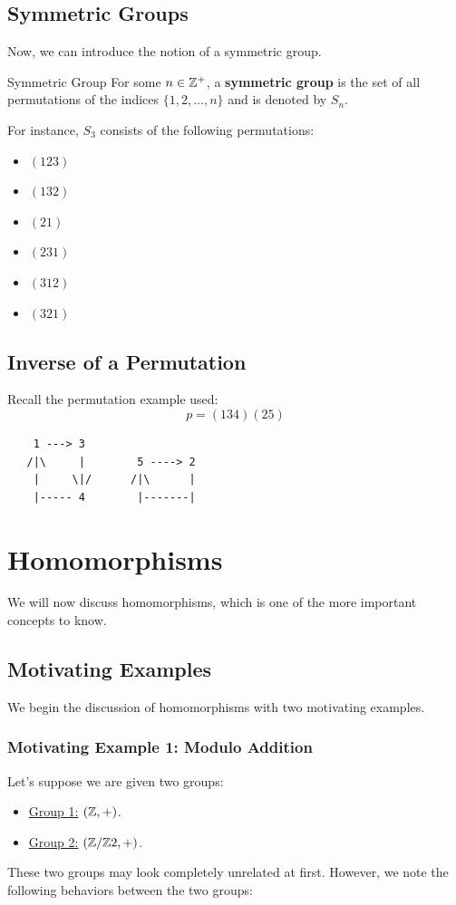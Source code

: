 \documentclass[letterpaper]{article}
\begin{document}
\subsection{Symmetric Groups}
Now, we can introduce the notion of a symmetric group. 
\begin{definition}{Symmetric Group}{}
    For some $n \in \mathbb{Z}^+$, a \textbf{symmetric group} is the set of all permutations of the indices $\{1, 2, \dots, n\}$ and is denoted by $S_n$. 
\end{definition}
For instance, $S_3$ consists of the following permutations: 
\begin{itemize}
    \item $(123)$
    \item $(132)$
    \item $(21)$
    \item $(231)$
    \item $(312)$
    \item $(321)$
\end{itemize}

\subsection{Inverse of a Permutation}
Recall the permutation example used: 
\[p = (1 3 4)(2 5)\]
\begin{verbatim}
    1 ---> 3
   /|\     |        5 ----> 2
    |     \|/      /|\      |
    |----- 4        |-------|
\end{verbatim}








\newpage 
\section{Homomorphisms}
We will now discuss homomorphisms, which is one of the more important concepts to know.  

\subsection{Motivating Examples}
We begin the discussion of homomorphisms with two motivating examples.

\subsubsection{Motivating Example 1: Modulo Addition}
Let's suppose we are given two groups: 
\begin{itemize}
    \item \underline{Group 1:} $(\mathbb{Z}, +)$. 
    \item \underline{Group 2:} $(\mathbb{Z} / \mathbb{Z} 2, +)$.
\end{itemize}
These two groups may look completely unrelated at first. However, we note the following behaviors between the two groups:
\end{document}
